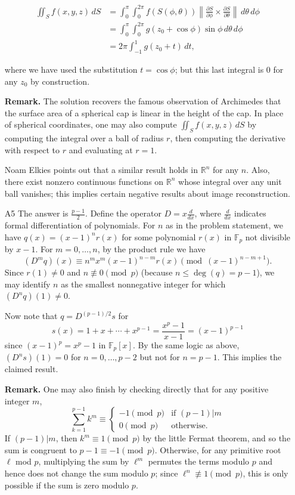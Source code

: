 \documentclass[amssymb,twocolumn,pra,10pt,aps]{revtex4-1}
\begin{document}
\begin{itemize}
\begin{align*}
\iint_S f(x,y,z)\,dS &= \int_0^\pi \int_0^{2\pi} f(S(\phi,\theta))\left\|\frac{\partial S}{\partial \phi} \times \frac{\partial S}{\partial \theta}\right\|\,d\theta\,d\phi \\
&=  \int_0^\pi \int_0^{2\pi} g(z_0+\cos\phi) \sin\phi\,d\theta\,d\phi \\
&= 2\pi \int_{-1}^1 g(z_0+t)\,dt,
\end{align*}

where we have used the substitution $t = \cos\phi$; but this last integral is $0$ for any $z_0$ by construction.

\noindent
\textbf{Remark.}
The solution recovers the famous observation of Archimedes that the surface area of a spherical cap is linear in the height of the cap. In place of spherical coordinates, one may also compute $\iint_S f(x,y,z)\,dS$ by computing the integral over a ball of radius $r$, then computing the derivative with respect to $r$ and evaluating at $r=1$.

Noam Elkies points out that a similar result holds in $\mathbb{R}^n$ for any $n$. Also, there exist nonzero continuous functions on $\mathbb{R}^n$ whose integral over any unit ball vanishes; this implies certain negative results about image reconstruction.

\item[A5]
The answer is $\frac{p-1}{2}$. 
Define the operator $D = x \frac{d}{dx}$, where $\frac{d}{dx}$ indicates formal differentiation of polynomials.
For $n$ as in the problem statement, we have $q(x) = (x-1)^n r(x)$ for some polynomial $r(x)$ in $\mathbb{F}_p$ not divisible by $x-1$. For $m=0,\dots,n$, by the product rule we have
\[
(D^m q)(x) \equiv n^m x^m (x-1)^{n-m} r(x) \pmod{(x-1)^{n-m+1}}.
\]
Since $r(1) \neq 0$ and $n \not\equiv 0 \pmod{p}$ (because $n \leq \deg(q) = p-1$), we may identify $n$ as the smallest nonnegative integer for which $(D^n q)(1) \neq 0$.

Now note that $q = D^{(p-1)/2} s$ for
\[
s(x) = 1 + x + \cdots + x^{p-1} = \frac{x^p-1}{x-1} = (x-1)^{p-1}
\]
since $(x-1)^p = x^p-1$ in $\mathbb{F}_p[x]$.
By the same logic as above, $(D^n s)(1) = 0$ for $n=0,\dots,p-2$ but not for $n=p-1$.
This implies the claimed result.

\noindent
\textbf{Remark.}
One may also finish by checking directly that 
for any positive integer $m$,
\[
\sum_{k=1}^{p-1} k^m \equiv \begin{cases} -1 \pmod{p} & \mbox{if $(p-1)|m$} \\
0 \pmod{p} & \mbox{otherwise.}
\end{cases}
\]
If $(p-1) | m$, then $k^m \equiv 1 \pmod{p}$ by the little Fermat theorem, and so the sum is congruent
to $p-1 \equiv -1 \pmod{p}$. Otherwise, for any primitive root $\ell$ mod $p$, multiplying the sum by $\ell^m$ permutes the terms modulo $p$ and hence does not change the sum modulo $p$; since $\ell^n \not\equiv 1 \pmod{p}$, this is only possible if the sum is zero modulo $p$.



\end{itemize}
\end{document}
